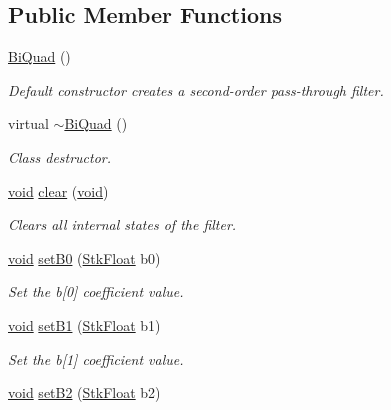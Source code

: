\subsection*{Public Member Functions}
\begin{DoxyCompactItemize}
\item 
\hyperlink{class_nyq_1_1_bi_quad_a8f2bb92da73143e3c4037ef2eb54ddf1}{Bi\+Quad} ()
\begin{DoxyCompactList}\small\item\em Default constructor creates a second-\/order pass-\/through filter. \end{DoxyCompactList}\item 
virtual \hyperlink{class_nyq_1_1_bi_quad_ac10f8dda917cf7b9b0c63be98f9d15dc}{$\sim$\+Bi\+Quad} ()
\begin{DoxyCompactList}\small\item\em Class destructor. \end{DoxyCompactList}\item 
\hyperlink{sound_8c_ae35f5844602719cf66324f4de2a658b3}{void} \hyperlink{class_nyq_1_1_bi_quad_ac72c9318ccd3a528bcfddc18202cb86b}{clear} (\hyperlink{sound_8c_ae35f5844602719cf66324f4de2a658b3}{void})
\begin{DoxyCompactList}\small\item\em Clears all internal states of the filter. \end{DoxyCompactList}\item 
\hyperlink{sound_8c_ae35f5844602719cf66324f4de2a658b3}{void} \hyperlink{class_nyq_1_1_bi_quad_a0ed23382a90e624ef779d3eb88f684b0}{set\+B0} (\hyperlink{namespace_nyq_a044fa20a706520a617bbbf458a7db7e4}{Stk\+Float} b0)
\begin{DoxyCompactList}\small\item\em Set the b\mbox{[}0\mbox{]} coefficient value. \end{DoxyCompactList}\item 
\hyperlink{sound_8c_ae35f5844602719cf66324f4de2a658b3}{void} \hyperlink{class_nyq_1_1_bi_quad_a4e159485b74dc051207be748c769f046}{set\+B1} (\hyperlink{namespace_nyq_a044fa20a706520a617bbbf458a7db7e4}{Stk\+Float} b1)
\begin{DoxyCompactList}\small\item\em Set the b\mbox{[}1\mbox{]} coefficient value. \end{DoxyCompactList}\item 
\hyperlink{sound_8c_ae35f5844602719cf66324f4de2a658b3}{void} \hyperlink{class_nyq_1_1_bi_quad_add8d5bbf3d97a5a348599f830aa29b5a}{set\+B2} (\hyperlink{namespace_nyq_a044fa20a706520a617bbbf458a7db7e4}{Stk\+Float} b2)

\end{DoxyCompactItemize}
